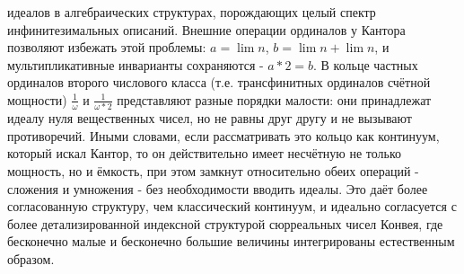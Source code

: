 \documentclass[12pt]{article}
\begin{document}
идеалов в алгебраических структурах, порождающих целый спектр инфинитезимальных описаний. Внешние операции ординалов у Кантора позволяют избежать этой проблемы: $a = \lim n$, $b = \lim n + \lim n$, и мультипликативные инварианты сохраняются - $a*2 = b$. В кольце частных ординалов второго числового класса (т.е. трансфинитных ординалов счётной мощности) $\frac{1}{\omega}$ и $\frac{1}{\omega*2}$ представляют разные порядки малости: они принадлежат идеалу нуля вещественных чисел, но не равны друг другу и не вызывают противоречий. Иными словами, если рассматривать это кольцо как континуум, который искал Кантор, то он действительно имеет несчётную не только мощность, но и ёмкость, при этом замкнут относительно обеих операций - сложения и умножения - без необходимости вводить идеалы. Это даёт более согласованную структуру, чем классический континуум, и идеально согласуется с более детализированной индексной структурой сюрреальных чисел Конвея, где бесконечно малые и бесконечно большие величины интегрированы естественным образом.
\end{document}
